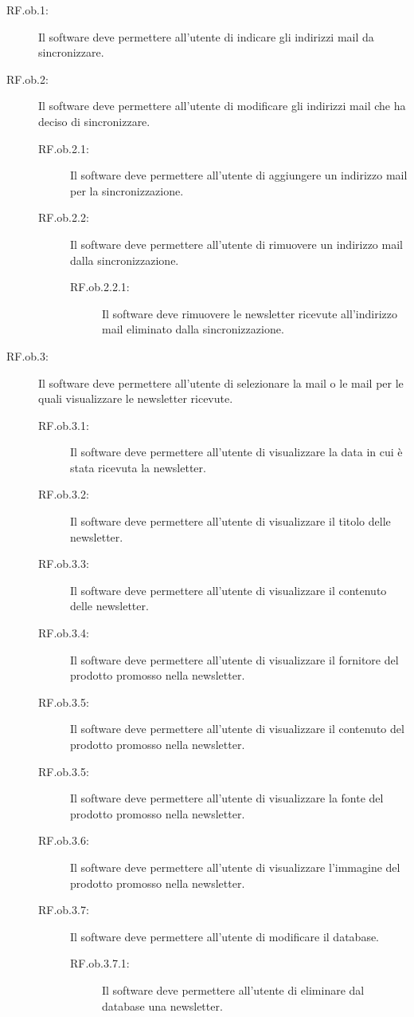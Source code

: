 \begin{description}
\item[RF.ob.1:] Il software deve permettere all\textquoteright{}utente di indicare gli indirizzi mail da sincronizzare.
\item[RF.ob.2:] Il software deve permettere all\textquoteright{}utente di modificare gli indirizzi mail che ha deciso di sincronizzare.
\begin{description}
\item[RF.ob.2.1:] Il software deve permettere all\textquoteright{}utente di aggiungere un indirizzo mail per la sincronizzazione.
\item[RF.ob.2.2:] Il software deve permettere all\textquoteright{}utente di rimuovere un indirizzo mail dalla sincronizzazione.
\begin{description}
\item[RF.ob.2.2.1:] Il software deve rimuovere le newsletter ricevute all\textquoteright{}indirizzo mail eliminato dalla sincronizzazione.
\end{description}
\end{description}
\item[RF.ob.3:] Il software deve permettere all\textquoteright{}utente di selezionare la mail o le mail per le quali visualizzare le newsletter ricevute.
\begin{description}
\item[RF.ob.3.1:] Il software deve permettere all\textquoteright{}utente di visualizzare la data in cui \`{e} stata ricevuta la newsletter.
\item[RF.ob.3.2:] Il software deve permettere all\textquoteright{}utente di visualizzare il titolo delle newsletter.
\item[RF.ob.3.3:] Il software deve permettere all\textquoteright{}utente di visualizzare il contenuto delle newsletter.
\item[RF.ob.3.4:] Il software deve permettere all\textquoteright{}utente di visualizzare il fornitore del prodotto promosso nella newsletter.
\item[RF.ob.3.5:] Il software deve permettere all\textquoteright{}utente di visualizzare il contenuto del prodotto promosso nella newsletter.
\item[RF.ob.3.5:] Il software deve permettere all\textquoteright{}utente di visualizzare la fonte del prodotto promosso nella newsletter.
\item[RF.ob.3.6:] Il software deve permettere all\textquoteright{}utente di visualizzare l\textquoteright{}immagine del prodotto promosso nella newsletter.
\item[RF.ob.3.7:] Il software deve permettere all\textquoteright{}utente di modificare il database.
\begin{description}
\item[RF.ob.3.7.1:] Il software deve permettere all\textquoteright{}utente di eliminare dal database una newsletter.
\end{description}
\end{description}
\end{description}

